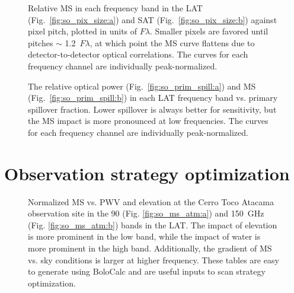 \begin{figure}[!ht]
    \caption[Sensitivity comparison between candidate SO LAT configurations]{Relative MS in each frequency band in the LAT (Fig.~\ref{fig:so_pix_size:a}) and SAT (Fig.~\ref{fig:so_pix_size:b}) against pixel pitch, plotted in units of $F \lambda$. Smaller pixels are favored until pitches $\sim$ 1.2~$F \lambda$, at which point the MS curve flattens due to detector-to-detector optical correlations. The curves for each frequency channel are individually peak-normalized.}
    \label{fig:so_pix_size}
\end{figure}

\begin{figure}[!ht]
    \caption[Impact of SO LAT primary spillover on optical power and mapping speed]{The relative optical power (Fig.~\ref{fig:so_prim_spill:a}) and MS (Fig.~\ref{fig:so_prim_spill:b}) in each LAT frequency band vs. primary spillover fraction. Lower spillover is always better for sensitivity, but the MS impact is more pronounced at low frequencies. The curves for each frequency channel are individually peak-normalized.}
    \label{fig:so_prim_spill}
\end{figure}

\section{Observation strategy optimization}

\begin{figure}[!ht]
    \caption[Impact of boresight elevation and PWV on SO mapping speed]{Normalized MS vs. PWV and elevation at the Cerro Toco Atacama observation site in the 90 (Fig. \ref{fig:so_ms_atm:a}) and 150~GHz (Fig. \ref{fig:so_ms_atm:b}) bands in the LAT. The impact of elevation is more prominent in the low band, while the impact of water is more prominent in the high band. Additionally, the gradient of MS vs. sky conditions is larger at higher frequency. These tables are easy to generate using BoloCalc and are useful inputs to scan strategy optimization.}
    \label{fig:so_ms_atm}
\end{figure}

